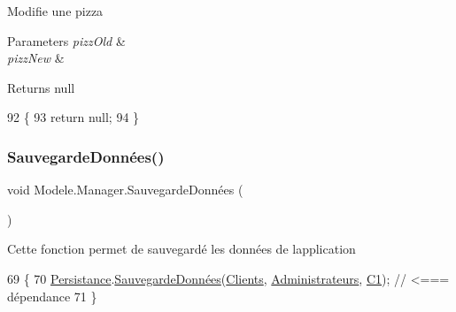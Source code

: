 Modifie une pizza 


\begin{DoxyParams}{Parameters}
{\em pizz\+Old} & \\
\hline
{\em pizz\+New} & \\
\hline
\end{DoxyParams}
\begin{DoxyReturn}{Returns}
null
\end{DoxyReturn}

\begin{DoxyCode}
92         \{
93             \textcolor{keywordflow}{return} null;
94         \}
\end{DoxyCode}
\mbox{\label{classModele_1_1Manager_a1401389e33f047e9fd896ee0383fd01f}} 
\subsubsection{\texorpdfstring{Sauvegarde\+Données()}{SauvegardeDonnées()}}
{\footnotesize\ttfamily void Modele.\+Manager.\+Sauvegarde\+Données (\begin{DoxyParamCaption}{ }\end{DoxyParamCaption})\hspace{0.3cm}{\ttfamily [inline]}}



Cette fonction permet de sauvegardé les données de l\textquotesingle{}application 


\begin{DoxyCode}
69         \{
70             \hyperlink{classModele_1_1Manager_a29b4f8c42f993178aac1d16da7942324}{Persistance}.\hyperlink{interfaceModele_1_1IPersistanceManager_a1b1fcf75cf99ef247ad7f83b1e816ea4}{SauvegardeDonnées}(\hyperlink{classModele_1_1Manager_aa91d850a379289e56012fc9b3912a7fe}{Clients}, 
      \hyperlink{classModele_1_1Manager_ac8440a9781b104ad429965fcd460bf2f}{Administrateurs}, \hyperlink{classModele_1_1Manager_a54bbc7bd646fcaa0f1a590310dd3c02c}{C1}); \textcolor{comment}{// <=== dépendance}
71         \}
\end{DoxyCode}
\mbox{\label{classModele_1_1Manager_a2c5255bdd1628cbe62c8d72cba13de83}} 
